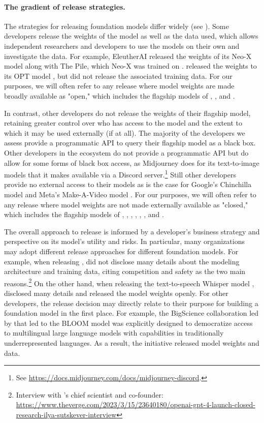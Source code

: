 \documentclass[screen, authorversion, acmsmall]{acmart}
\begin{document}
\paragraph{The gradient of release strategies.}
The strategies for releasing foundation models differ widely (see ). Some developers release the weights of the model as well as the data used, which allows independent researchers and developers to use the models on their own and investigate the data. For example, EleutherAI released the weights of its Neo-X model \citep{black2022neox} along with The Pile, which Neo-X was trained on \citep{gao2021thepile}.
\meta released the weights to its OPT model \citep{zhang2022opt}, but did not release the associated training data.
For our purposes, we will often refer to any release where model weights are made broadly available as "open," which includes the flagship models of \huggingface, \meta, and \stability.

In contrast, other developers do not release the weights of their flagship model, retaining greater control over who has access to the model and the extent to which it may be used externally (if at all).
The majority of the developers we assess provide a programmatic API to query their flagship model as a black box.
Other developers in the ecosystem do not provide a programmatic API but do allow for some forms of black box access, as Midjourney does for its text-to-image models that it makes available via a Discord server.\footnote{See \url{https://docs.midjourney.com/docs/midjourney-discord}.}
Still other developers provide no external access to their models as is the case for Google's Chinchilla model \citep{hoffmann2022chinchilla} and Meta's Make-A-Video model \citep{singer2022makeavideo}.
For our purposes, we will often refer to any release where model weights are not made externally available as "closed," which includes the flagship models of \aitwentyone, \amazon, \anthropic, \cohere, \google, \inflection, and \openai.

The overall approach to release is informed by a developer's business strategy and perspective on its model's utility and risks. 
In particular, many organizations may adopt different release approaches for different foundation models.
For example, when releasing \gptfour, \openai did not disclose many details about the modeling architecture and training data, citing competition and safety as the two main reasons.\footnote{Interview with \openai's chief scientist and co-founder: \url{https://www.theverge.com/2023/3/15/23640180/openai-gpt-4-launch-closed-research-ilya-sutskever-interview}} 
On the other hand, when releasing the text-to-speech Whisper model \cite{radford2022whisper}, \openai disclosed many details and released the model weights openly.
For other developers, the release decision may directly relate to their purpose for building a foundation model in the first place.
For example, the BigScience collaboration led by \huggingface that led to the BLOOM model \citep{scao2022bloom} was explicitly designed to democratize access to multilingual large language models with capabilities in traditionally underrepresented languages.
As a result, the initiative released model weights and data. \clearpage
\end{document}
